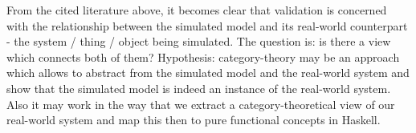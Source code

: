 From the cited literature above, it becomes clear that validation is concerned with the relationship between the simulated model and its real-world counterpart - the system / thing / object being simulated.
The question is: is there a view which connects both of them? Hypothesis: category-theory may be an approach which allows to abstract from the simulated model and the real-world system and show that the simulated model is indeed an instance of the real-world system. Also it may work in the way that we extract a category-theoretical view of our real-world system and map this then to pure functional concepts in Haskell.